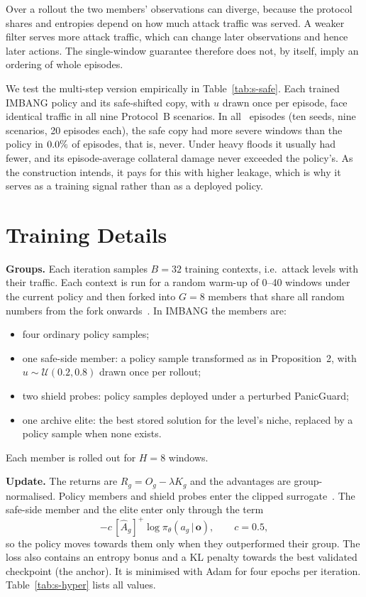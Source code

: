 \documentclass[10pt,journal,onecolumn]{IEEEtran}
\begin{document}
Over a rollout the two members' observations can diverge, because the protocol shares and entropies depend on how much attack traffic was served. A weaker filter serves more attack traffic, which can change later observations and hence later actions. The single-window guarantee therefore does not, by itself, imply an ordering of whole episodes.

We test the multi-step version empirically in Table~\ref{tab:s-safe}. Each trained IMBANG policy and its safe-shifted copy, with $u$ drawn once per episode, face identical traffic in all nine Protocol~B scenarios. In all \nSafeEpisodes\ episodes (ten seeds, nine scenarios, 20 episodes each), the safe copy had more severe windows than the policy in $0.0\%$ of episodes, that is, never. Under heavy floods it usually had fewer, and its episode-average collateral damage never exceeded the policy's. As the construction intends, it pays for this with higher leakage, which is why it serves as a training signal rather than as a deployed policy.



\section{Training Details}
\label{sec:s-train}
\textbf{Groups.} Each iteration samples $B=32$ training contexts, i.e.\ attack levels with their traffic. Each context is run for a random warm-up of 0--40 windows under the current policy and then forked into $G=8$ members that share all random numbers from the fork onwards~\cite{ng2000pegasus}. In IMBANG the members are:
\begin{itemize}
\item four ordinary policy samples;
\item one safe-side member: a policy sample transformed as in Proposition~2, with $u\sim\mathcal{U}(0.2,0.8)$ drawn once per rollout;
\item two shield probes: policy samples deployed under a perturbed PanicGuard;
\item one archive elite: the best stored solution for the level's niche, replaced by a policy sample when none exists.
\end{itemize}
Each member is rolled out for $H=8$ windows.

\textbf{Update.} The returns are $R_g=O_g-\lambda K_g$ and the advantages are group-normalised. Policy members and shield probes enter the clipped surrogate~\cite{schulman2017ppo}. The safe-side member and the elite enter only through the term
\begin{equation}
-c\,[\hat A_g]^+\log\pi_\theta(a_g\,|\,\mathbf{o}),\qquad c=0.5,
\end{equation}
so the policy moves towards them only when they outperformed their group. The loss also contains an entropy bonus and a KL penalty towards the best validated checkpoint (the anchor). It is minimised with Adam for four epochs per iteration. Table~\ref{tab:s-hyper} lists all values.
\end{document}
